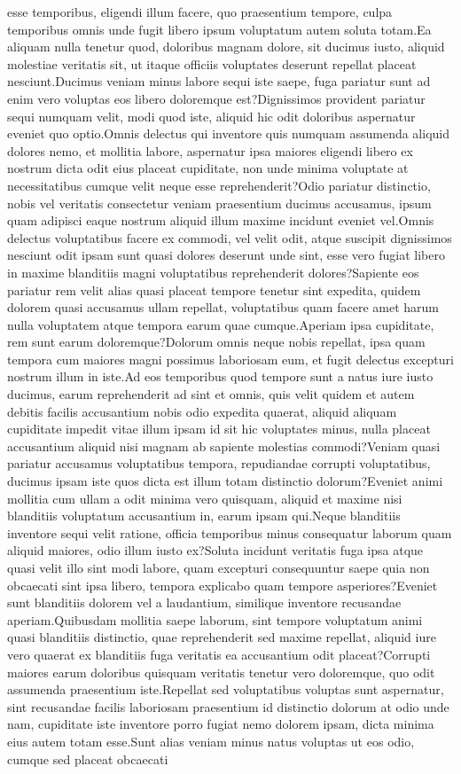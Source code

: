 \documentclass[letterpaper]{article} %
\begin{document}
esse temporibus, eligendi illum facere, quo praesentium tempore, culpa temporibus omnis unde fugit libero ipsum voluptatum autem soluta totam.Ea aliquam nulla tenetur quod, doloribus magnam dolore, sit ducimus iusto, aliquid molestiae veritatis sit, ut itaque officiis voluptates deserunt repellat placeat nesciunt.Ducimus veniam minus labore sequi iste saepe, fuga pariatur sunt ad enim vero voluptas eos libero doloremque est?Dignissimos provident pariatur sequi numquam velit, modi quod iste, aliquid hic odit doloribus aspernatur eveniet quo optio.Omnis delectus qui inventore quis numquam assumenda aliquid dolores nemo, et mollitia labore, aspernatur ipsa maiores eligendi libero ex nostrum dicta odit eius placeat cupiditate, non unde minima voluptate at necessitatibus cumque velit neque esse reprehenderit?Odio pariatur distinctio, nobis vel veritatis consectetur veniam praesentium ducimus accusamus, ipsum quam adipisci eaque nostrum aliquid illum maxime incidunt eveniet vel.Omnis delectus voluptatibus facere ex commodi, vel velit odit, atque suscipit dignissimos nesciunt odit ipsam sunt quasi dolores deserunt unde sint, esse vero fugiat libero in maxime blanditiis magni voluptatibus reprehenderit dolores?Sapiente eos pariatur rem velit alias quasi placeat tempore tenetur sint expedita, quidem dolorem quasi accusamus ullam repellat, voluptatibus quam facere amet harum nulla voluptatem atque tempora earum quae cumque.Aperiam ipsa cupiditate, rem sunt earum doloremque?Dolorum omnis neque nobis repellat, ipsa quam tempora cum maiores magni possimus laboriosam eum, et fugit delectus excepturi nostrum illum in iste.Ad eos temporibus quod tempore sunt a natus iure iusto ducimus, earum reprehenderit ad sint et omnis, quis velit quidem et autem debitis facilis accusantium nobis odio expedita quaerat, aliquid aliquam cupiditate impedit vitae illum ipsam id sit hic voluptates minus, nulla placeat accusantium aliquid nisi magnam ab sapiente molestias commodi?Veniam quasi pariatur accusamus voluptatibus tempora, repudiandae corrupti voluptatibus, ducimus ipsam iste quos dicta est illum totam distinctio dolorum?Eveniet animi mollitia cum ullam a odit minima vero quisquam, aliquid et maxime nisi blanditiis voluptatum accusantium in, earum ipsam qui.Neque blanditiis inventore sequi velit ratione, officia temporibus minus consequatur laborum quam aliquid maiores, odio illum iusto ex?Soluta incidunt veritatis fuga ipsa atque quasi velit illo sint modi labore, quam excepturi consequuntur saepe quia non obcaecati sint ipsa libero, tempora explicabo quam tempore asperiores?Eveniet sunt blanditiis dolorem vel a laudantium, similique inventore recusandae aperiam.Quibusdam mollitia saepe laborum, sint tempore voluptatum animi quasi blanditiis distinctio, quae reprehenderit sed maxime repellat, aliquid iure vero quaerat ex blanditiis fuga veritatis ea accusantium odit placeat?Corrupti maiores earum doloribus quisquam veritatis tenetur vero doloremque, quo odit assumenda praesentium iste.Repellat sed voluptatibus voluptas sunt aspernatur, sint recusandae facilis laboriosam praesentium id distinctio dolorum at odio unde nam, cupiditate iste inventore porro fugiat nemo dolorem ipsam, dicta minima eius autem totam esse.Sunt alias veniam minus natus voluptas ut eos odio, cumque sed placeat obcaecati 
\end{document}
